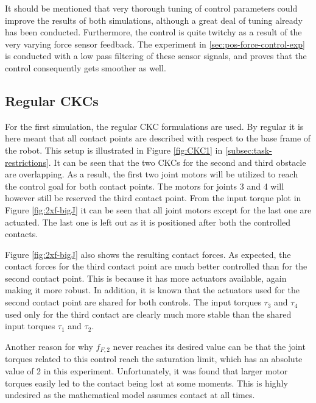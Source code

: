 It should be mentioned that very thorough tuning of control parameters could improve the results of both simulations, although a great deal of tuning already has been conducted. Furthermore, the control is quite twitchy as a result of the very varying force sensor feedback. The experiment in \ref{sec:pos-force-control-exp} is conducted with a low pass filtering of these sensor signals, and proves that the control consequently gets smoother as well.

\subsection{Regular CKCs}

For the first simulation, the regular CKC formulations are used. By regular it is here meant that all contact points are described with respect to the base frame of the robot. This setup is illustrated in Figure \ref{fig:CKC1} in \ref{subsec:task-restrictions}. It can be seen that the two CKCs for the second and third obstacle are overlapping. As a result, the first two joint motors will be utilized to reach the control goal for both contact points. The motors for joints 3 and 4 will however still be reserved the third contact point. From the input torque plot in Figure \ref{fig:2xf-bigJ} it can be seen that all joint motors except for the last one are actuated. The last one is left out as it is positioned after both the controlled contacts. 

Figure \ref{fig:2xf-bigJ} also shows the resulting contact forces. As expected, the contact forces for the third contact point are much better controlled than for the second contact point. This is because it has more actuators available, again making it more robust. In addition, it is known that the actuators used for the second contact point are shared for both controls. The input torques $\tau_3$ and $\tau_4$ used only for the third contact are clearly much more stable than the shared input torques $\tau_1$ and $\tau_2$.

Another reason for why $f_{F,2}$ never reaches its desired value can be that the joint torques related to this control reach the saturation limit, which has an absolute value of 2 in this experiment. Unfortunately, it was found that larger motor torques easily led to the contact being lost at some moments. This is highly undesired as the mathematical model assumes contact at all times.

